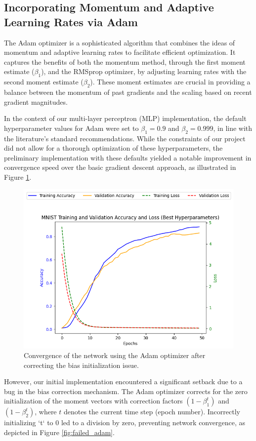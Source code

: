 \documentclass[letterpaper]{article}
\begin{document}
\subsection{Incorporating Momentum and Adaptive Learning Rates via Adam}
\label{subsec:adam}

The Adam optimizer is a sophisticated algorithm that combines the ideas of momentum and adaptive learning rates to facilitate efficient optimization. It captures the benefits of both the momentum method, through the first moment estimate (\(\beta_1\)), and the RMSprop optimizer, by adjusting learning rates with the second moment estimate (\(\beta_2\)). These moment estimates are crucial in providing a balance between the momentum of past gradients and the scaling based on recent gradient magnitudes.

In the context of our multi-layer perceptron (MLP) implementation, the default hyperparameter values for Adam were set to \(\beta_1=0.9\) and \(\beta_2=0.999\), in line with the literature's standard recommendations. While the constraints of our project did not allow for a thorough optimization of these hyperparameters, the preliminary implementation with these defaults yielded a notable improvement in convergence speed over the basic gradient descent approach, as illustrated in Figure \ref{fig:successful_adam}.

\begin{figure}[ht]
    \centering
    \includegraphics[width=0.8\linewidth]{successful_adam.png}
    \caption{Convergence of the network using the Adam optimizer after correcting the bias initialization issue.}
    \label{fig:successful_adam}
\end{figure}

However, our initial implementation encountered a significant setback due to a bug in the bias correction mechanism. The Adam optimizer corrects for the zero initialization of the moment vectors with correction factors \( (1 - \beta_1^t) \) and \( (1 - \beta_2^t) \), where \( t \) denotes the current time step (epoch number). Incorrectly initializing `t` to 0 led to a division by zero, preventing network convergence, as depicted in Figure \ref{fig:failed_adam}.
\end{document}

